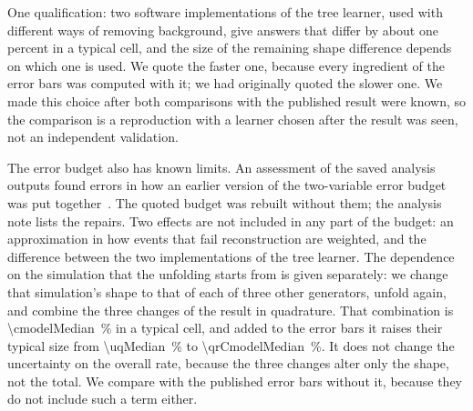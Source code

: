 One qualification: two software implementations of the tree learner, used with different ways of removing background, give answers that differ by about one percent in a typical cell, and the size of the remaining shape difference depends on which one is used. We quote the faster one, because every ingredient of the error bars was computed with it; we had originally quoted the slower one. We made this choice after both comparisons with the published result were known, so the comparison is a reproduction with a learner chosen after the result was seen, not an independent validation.

The error budget also has known limits. An assessment of the saved analysis outputs found errors in how an earlier version of the two-variable error budget was put together~\cite{TwoDFollowup2026}. The quoted budget was rebuilt without them; the analysis note lists the repairs. Two effects are not included in any part of the budget: an approximation in how events that fail reconstruction are weighted, and the difference between the two implementations of the tree learner. The dependence on the simulation that the unfolding starts from is given separately: we change that simulation's shape to that of each of three other generators, unfold again, and combine the three changes of the result in quadrature. That combination is \SI{\cmodelMedian}{\percent} in a typical cell, and added to the error bars it raises their typical size from \SI{\uqMedian}{\percent} to \SI{\qrCmodelMedian}{\percent}. It does not change the uncertainty on the overall rate, because the three changes alter only the shape, not the total. We compare with the published error bars without it, because they do not include such a term either.


